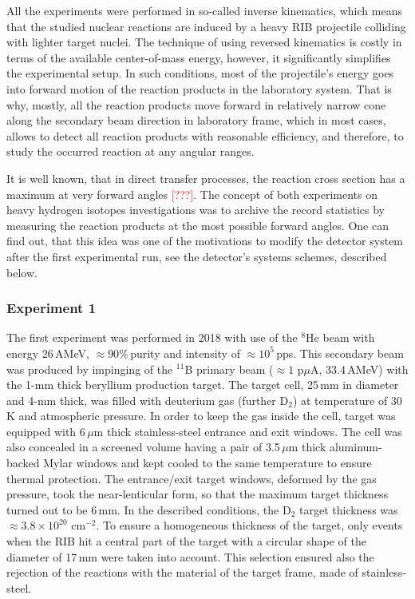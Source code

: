 All the experiments were performed in so-called inverse kinematics, which means that the studied nuclear reactions are induced by a heavy RIB projectile colliding with lighter target nuclei.
The technique of using reversed kinematics is costly in terms of the available center-of-mass energy, however, it significantly simplifies the experimental setup.
In such conditions, most of the projectile's energy goes into forward motion of the reaction products in the laboratory system. 
That is why, mostly, all the reaction products move forward in relatively narrow cone along the secondary beam direction in laboratory frame, which in most cases, allows to detect all reaction products with reasonable efficiency, and therefore, to study the occurred reaction at any angular ranges. 

It is well known, that in direct transfer processes, the reaction cross section has a maximum at very forward angles \textcolor{red}{[???]}. 
The concept of both experiments on heavy hydrogen isotopes investigations was to archive the record statistics by measuring the reaction products at the most possible forward angles.
One can find out, that this idea was one of the motivations to modify the detector system after the first experimental run, see the detector's systems schemes, described below.

\subsubsection{Experiment 1}

The first experiment was performed in 2018 with use of the $^{8}$He beam with energy 26\,AMeV, $\approx90\%$\,purity and intensity of $\approx10^{5}$\,pps.
This secondary beam was produced by impinging of the $^{11}$B primary beam ($\approx 1$ p$\mu$A, 33.4\,AMeV) with  the 1-mm thick beryllium production target.
The target cell, 25\,mm in diameter and 4-mm thick, was filled with deuterium gas (further D$_{2}$) at temperature of 30\,K and atmospheric pressure. 
In order to keep the gas inside the cell, target was equipped with 6\,$\mu$m thick stainless-steel entrance and exit windows.
The cell was also concealed in a screened volume having a pair of 3.5\,$\mu$m thick aluminum-backed Mylar windows and kept cooled to the same temperature to ensure thermal protection.
The entrance/exit target windows, deformed by the gas pressure, took the near-lenticular form, so that the maximum target thickness turned out to be 6\,mm.
In the described conditions, the D$_{2}$ target thickness was $\approx 3.8 \times 10 ^{20}$ cm$^{-2}$.
To ensure a homogeneous thickness of the target, only events when the RIB hit a central part of the target with a circular shape of the diameter of 17\,mm were taken into account.
This selection ensured also the rejection of the reactions with the material of the target frame, made of stainless-steel.

